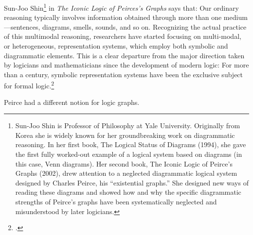 Sun-Joo Shin\footnote{Sun-Joo Shin is Professor of Philosophy at Yale University. Originally from Korea she is widely
known for her groundbreaking work on diagrammatic reasoning. In her first
book, The Logical Status of Diagrams (1994), she gave the first fully
worked-out example of a logical system based on diagrams (in this case,
Venn diagrams). Her second book, The Iconic Logic of Peirce’s Graphs
(2002), drew attention to a neglected diagrammatic logical system designed
by Charles Peirce, his “existential graphs.” She designed new ways of reading these diagrams and showed how and why the specific diagrammatic
strengths of Peirce’s graphs have been systematically neglected and misunderstood by later logicians. } in \emph{The Iconic Logic of Peirces's Graphs} says that:
Our ordinary reasoning typically involves information
obtained through more than one medium—sentences, diagrams,
smells, sounds, and so on. Recognizing the actual practice of this multimodal
reasoning, researchers have started focusing on multi-modal,
or heterogeneous, representation systems, which employ both symbolic
and diagrammatic elements. This is a clear departure from the major
direction taken by logicians and mathematicians since the development
of modern logic: For more than a century, symbolic representation systems
have been the exclusive subject for formal logic.\footcite{shin2002}

Peirce had a different notion for logic graphs. 



